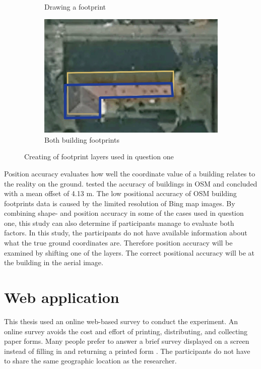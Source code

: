 \begin{figure}[H]
\begin{subfigure}[b]{0.32\textwidth}
		\caption{Drawing a footprint}
		\label{fig:build2}
	\end{subfigure}
	\begin{subfigure}[b]{0.32\textwidth}
		\centering
		\includegraphics[width=\linewidth]{fig/build3}
		\caption{Both building footprints}
		\label{fig:build3.jpg}
	\end{subfigure}
	\caption{Creating of footprint layers used in question one}
	\label{fig:building_creation_example}
\end{figure}

Position accuracy evaluates how well the coordinate value of a building relates to the reality on the ground. \cite{Fan2014} tested the accuracy of buildings in OSM and concluded with a mean offset of 4.13 m. The low positional accuracy of OSM building footprints data is caused by the limited resolution of Bing map images. By combining shape- and position accuracy in some of the cases used in question one, this study can also determine if participants manage to evaluate both factors. In this study, the participants do not have available information about what the true ground coordinates are. Therefore position accuracy will be examined by shifting one of the layers. The correct positional accuracy will be at the building in the aerial image. 

\section{Web application}
This thesis used an online web-based survey to conduct the experiment. An online survey avoids the cost and effort of printing, distributing, and collecting paper forms. Many people prefer to answer a brief survey displayed on a screen instead of filling in and returning a printed form \citep{Ben2009}. The participants do not have to share the same geographic location as the researcher. 

